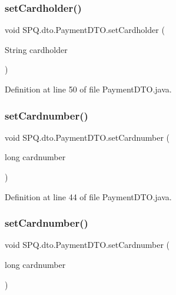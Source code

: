 \subsubsection{\texorpdfstring{set\+Cardholder()}{setCardholder()}\hspace{0.1cm}{\footnotesize\ttfamily [3/3]}}
{\footnotesize\ttfamily void S\+P\+Q.\+dto.\+Payment\+D\+T\+O.\+set\+Cardholder (\begin{DoxyParamCaption}\item[{String}]{cardholder }\end{DoxyParamCaption})}



Definition at line 50 of file Payment\+D\+T\+O.\+java.

\mbox{\label{class_s_p_q_1_1dto_1_1_payment_d_t_o_a2b84f1e7da9d3d9966d5170ae0595839}} 
\subsubsection{\texorpdfstring{set\+Cardnumber()}{setCardnumber()}\hspace{0.1cm}{\footnotesize\ttfamily [1/3]}}
{\footnotesize\ttfamily void S\+P\+Q.\+dto.\+Payment\+D\+T\+O.\+set\+Cardnumber (\begin{DoxyParamCaption}\item[{long}]{cardnumber }\end{DoxyParamCaption})}



Definition at line 44 of file Payment\+D\+T\+O.\+java.

\mbox{\label{class_s_p_q_1_1dto_1_1_payment_d_t_o_a2b84f1e7da9d3d9966d5170ae0595839}} 
\subsubsection{\texorpdfstring{set\+Cardnumber()}{setCardnumber()}\hspace{0.1cm}{\footnotesize\ttfamily [2/3]}}
{\footnotesize\ttfamily void S\+P\+Q.\+dto.\+Payment\+D\+T\+O.\+set\+Cardnumber (\begin{DoxyParamCaption}\item[{long}]{cardnumber }\end{DoxyParamCaption})}



